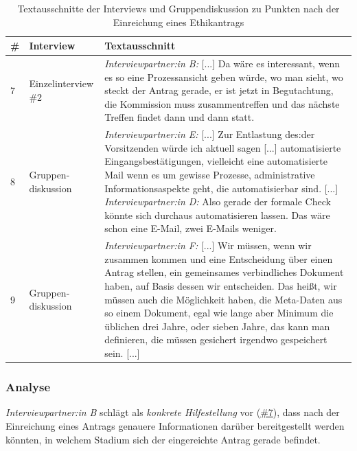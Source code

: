 \documentclass[a4paper,12pt,twoside,numbers=noendperiod]{scrreprt}
\begin{document}
\begin{table}[ht!]
    \centering
    \begin{tabular}{p{.05\linewidth} | p{.2\linewidth} | p{.65\linewidth}}
        \# & \textbf{Interview} & \textbf{Textausschnitt}\\
        \hline
        7 & Einzelinterview \#2 & \textit{Interviewpartner:in B:} [...] Da wäre es interessant, wenn es so eine Prozessansicht geben würde, wo man sieht, wo steckt der Antrag gerade, er ist jetzt in Begutachtung, die Kommission muss zusammentreffen und das nächste Treffen findet dann und dann statt. \\
        \hline
        8 & Gruppen-diskussion & \textit{Interviewpartner:in E:} [...] Zur Entlastung des:der Vorsitzenden würde ich aktuell sagen [...] automatisierte Eingangsbestätigungen, vielleicht eine automatisierte Mail wenn es um gewisse Prozesse, administrative Informationsaspekte geht, die automatisierbar sind. [...]\newline
        \textit{Interviewpartner:in D:} Also gerade der formale Check könnte sich durchaus automatisieren lassen. Das wäre schon eine E-Mail, zwei E-Mails weniger. \\
        \hline
        9 & Gruppen-diskussion & \textit{Interviewpartner:in F:} [...] Wir müssen, wenn wir zusammen kommen und eine Entscheidung über einen Antrag stellen, ein gemeinsames verbindliches Dokument haben, auf Basis dessen wir entscheiden. Das heißt, wir müssen auch die Möglichkeit haben, die Meta-Daten aus so einem Dokument, egal wie lange aber Minimum die üblichen drei Jahre, oder sieben Jahre, das kann man definieren, die müssen gesichert irgendwo gespeichert sein. [...]
    \end{tabular}
    \caption{Textausschnitte der Interviews und Gruppendiskussion zu Punkten nach der Einreichung eines Ethikantrags}
    \label{tab:anforderungen-nach-einreichung}
\end{table}

\subsubsection*{Analyse}
\label{sub-sub-sec:analyse-nach-einreichung}

\textit{Interviewpartner:in B} schlägt als \textit{konkrete Hilfestellung} vor (\hyperref[tab:anforderungen-nach-einreichung]{\#7}), dass nach der Einreichung eines Antrags genauere Informationen darüber bereitgestellt werden könnten, in welchem Stadium sich der eingereichte Antrag gerade befindet.
\end{document}
